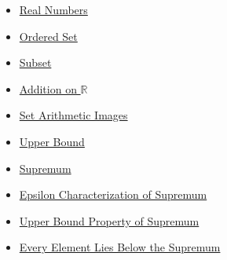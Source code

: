 \begin{dependencies}
\begin{itemize}
  \item \hyperref[def:reals]{Real Numbers}
  \item \hyperref[def:ordered-set]{Ordered Set}
  \item \hyperref[def:subset]{Subset}
  \item \hyperref[def:addition-on-r]{Addition on $\mathbb{R}$}
  \item \hyperref[def:set-arithmetic-images]{Set Arithmetic Images}
  \item \hyperref[def:real-upper-bound]{Upper Bound}
  \item \hyperref[def:supremum]{Supremum}
  \item \hyperref[def:epsilon-characterization-of-supremum]{Epsilon Characterization of Supremum}
  \item \hyperref[prop:upper-bound-property-of-supremum]{Upper Bound Property of Supremum}
  \item \hyperref[prop:every-element-lies-below-the-supremum]{Every Element Lies Below the Supremum}
\end{itemize}
\end{dependencies}

